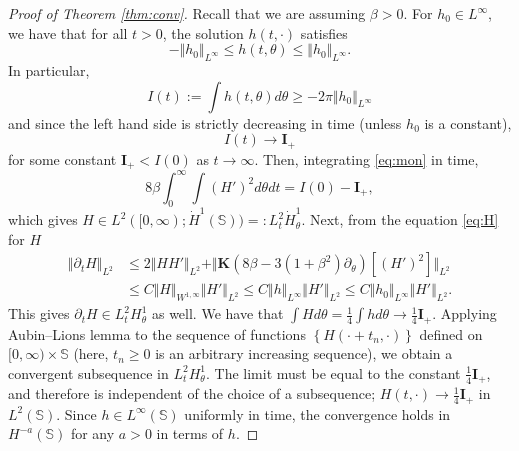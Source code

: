 \documentclass[10pt]{amsart}
\theoremstyle{plain}
\theoremstyle{definition}
\newcommand{\nrm}[1]{\Vert#1\Vert}
\let\rd\partial
\let\bt\beta
\let\tht\theta
\newcommand{\bfI}{{\mathbf I}}
\newcommand{\bfK}{{\mathbf K}}
\newcommand{\bbS}{\mathbb S}
\begin{document}
\begin{proof}[Proof of Theorem \ref{thm:conv}]
Recall that we are assuming $\bt>0$. For $h_0 \in L^\infty$, we have that for all $t>0$, the solution $h(t,\cdot)$ satisfies
\begin{equation*}
-\nrm{h_0}_{L^\infty} \le h(t,\tht) \le \nrm{h_0}_{L^\infty}.
\end{equation*}
In particular,
\begin{equation*}
I(t) := \int h(t,\tht) d\tht \ge -2\pi\nrm{h_0}_{L^\infty}
\end{equation*}
and since the left hand side is strictly decreasing in time (unless $h_0$ is a constant),
\begin{equation*}
I(t) \to \bfI_{+}
\end{equation*}
for some constant $\bfI_{+} < I(0)$ as $t\to\infty$. Then, integrating \eqref{eq:mon} in time,
\begin{equation*}
8\bt\int_0^\infty \int (H')^2 d\tht dt = I(0) - \bfI_{+},
\end{equation*}
which gives $H \in L^2([0,\infty); \dot{H}^1(\bbS)) =: L^2_t \dot{H}^1_\tht$. Next, from the equation \eqref{eq:H} for $H$
\begin{equation*}
\begin{split}
\nrm{\rd_tH}_{L^2} &\le 2\nrm{H H'}_{L^2} + \nrm{\bfK(8\bt - 3(1+\bt^2)\rd_\tht)\left[ (H')^2 \right]}_{L^2} \\
&\le C \nrm{H}_{W^{1,\infty}} \nrm{H'}_{L^2} \le C \nrm{h}_{L^\infty} \nrm{H'}_{L^2} \le C \nrm{h_0}_{L^{\infty}} \nrm{H'}_{L^2}.
\end{split}
\end{equation*}
This gives $\rd_tH \in L^2_tH^1_\tht$ as well. We have that $\int H d\tht = \frac14 \int h d\tht \to \frac14 \bfI_{+}$. Applying Aubin--Lions lemma to the sequence of functions $\left\{ H(\cdot+t_n, \cdot) \right\}$ defined on $[0,\infty)\times\bbS$ (here, $t_n\ge0 $ is an arbitrary increasing sequence), we obtain a convergent subsequence in $L^2_tH^1_\tht$. The limit must be equal to the constant $\frac14 \bfI_{+}$, and therefore is independent of the choice of a subsequence; $H(t,\cdot)\to \frac14 \bfI_{+}$ in $L^2(\bbS)$. Since $h\in L^\infty(\bbS)$ uniformly in time, the convergence holds in $H^{-a}(\bbS)$ for any $a>0$ in terms of $h$.
\end{proof}
\end{document}

